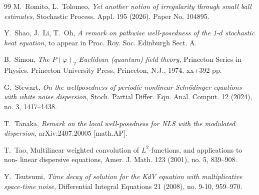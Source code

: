 \documentclass[letterpaper, 11pt,  reqno]{amsart}
\newcommand{\1}{\hspace{0.5mm}\textup{I}\hspace{0.5mm}}
\numberwithin{equation}{section}
\numberwithin{theorem}{section}
\begin{document}
\begin{thebibliography}{99}
M.~Romito, L.~Tolomeo, 
{\it Yet another notion of irregularity through small ball estimates},
 Stochastic Process. Appl. 195 (2026), Paper No. 104895. 

	
	
Y.~Shao, J.~Li,  T.~Oh, 
{\it 
A remark on pathwise well-posedness of 
the 1-$d$ stochastic heat equation}, 
to appear
in Proc. Roy. Soc. Edinburgh Sect. A.







B.~Simon, 
{\it  The $P(\varphi)_2$ Euclidean (quantum) field theory,} Princeton Series in Physics. Princeton University Press, Princeton, N.J., 1974. xx+392 pp.


G.~Stewart, 
{\it On the wellposedness of periodic nonlinear Schr\"odinger equations with white noise dispersion}, 
Stoch. Partial Differ. Equ. Anal. Comput. 12 (2024), no. 3, 1417--1438.





T.~Tanaka, 
{\it Remark on the local well-posedness for NLS with the modulated dispersion}, 
arXiv:2407.20005 [math.AP].


T.~Tao, 
{Multilinear weighted convolution of $L^2$-functions, and applications to non-
linear dispersive equations}, Amer. J. Math. 123 (2001), no. 5, 839--908.



Y.~Tsutsumi, {\it Time decay of solution for the KdV equation with multiplicative space-time noise,}  
Differential Integral Equations  21  (2008),  no. 9-10, 959--970. 










\end{thebibliography}
\end{document}
